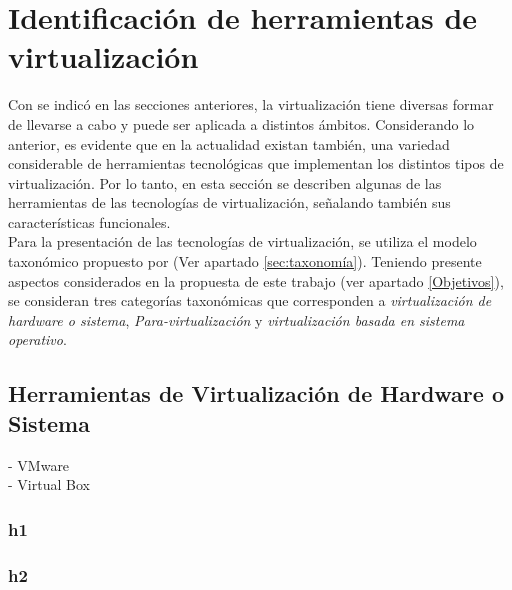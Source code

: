 \section{Identificación de herramientas de virtualización} \label{sec:herramientas}
\vspace{5mm}


Con se indicó en las secciones anteriores, la virtualización tiene diversas formar de llevarse a cabo y puede ser aplicada a distintos ámbitos. Considerando lo anterior, es evidente que en la actualidad existan también, una variedad considerable de herramientas tecnológicas que implementan los distintos tipos de virtualización.  Por lo tanto,  en esta sección se describen algunas de las herramientas de las tecnologías de virtualización, señalando también sus características funcionales.\\

Para la presentación de las tecnologías de virtualización, se utiliza el modelo taxonómico propuesto por \textcite{Pessolani2012} (Ver apartado \ref{sec:taxonomía}). Teniendo presente aspectos considerados en la propuesta de este trabajo (ver apartado \ref{Objetivos}), se consideran tres categorías taxonómicas que  corresponden a \textit{virtualización de hardware o sistema}, \textit{Para-virtualización} y \textit{virtualización basada en sistema operativo}.\\

\subsection{Herramientas de Virtualización de Hardware o Sistema}
\vspace{5mm}

- VMware \\
- Virtual Box \\


\subsubsection{h1}
\vspace{5mm}
\subsubsection{h2}
\vspace{5mm}

